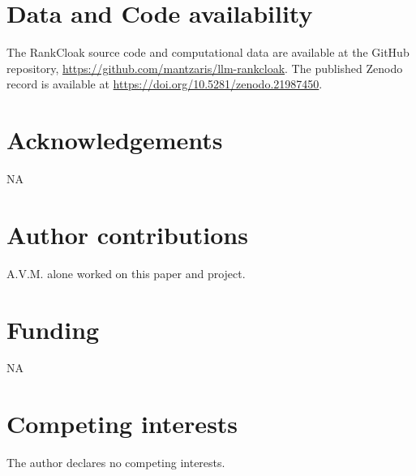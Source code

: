 \documentclass[fleqn,10pt]{wlscirep}
\begin{document}


\section*{Data and Code availability}\label{sec:data-code}

The RankCloak source code and computational data are available at the GitHub repository, \url{https://github.com/mantzaris/llm-rankcloak}. The published Zenodo record is available at \url{https://doi.org/10.5281/zenodo.21987450}.



\section*{Acknowledgements}

NA

\section*{Author contributions}

A.V.M. alone worked on this paper and project.

\section*{Funding}

NA

\section*{Competing interests}

The author declares no competing interests.
\end{document}
